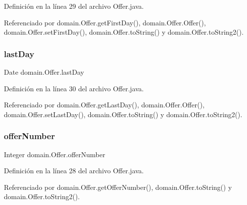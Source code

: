 Definición en la línea 29 del archivo Offer.\+java.



Referenciado por domain.\+Offer.\+get\+First\+Day(), domain.\+Offer.\+Offer(), domain.\+Offer.\+set\+First\+Day(), domain.\+Offer.\+to\+String() y domain.\+Offer.\+to\+String2().

\mbox{\label{classdomain_1_1_offer_a4d415274c0e120dd3e66e4ad46d7e2b2}} 
\subsubsection{\texorpdfstring{lastDay}{lastDay}}
{\footnotesize\ttfamily Date domain.\+Offer.\+last\+Day\hspace{0.3cm}{\ttfamily [private]}}



Definición en la línea 30 del archivo Offer.\+java.



Referenciado por domain.\+Offer.\+get\+Last\+Day(), domain.\+Offer.\+Offer(), domain.\+Offer.\+set\+Last\+Day(), domain.\+Offer.\+to\+String() y domain.\+Offer.\+to\+String2().

\mbox{\label{classdomain_1_1_offer_af77beec2989adcfb9b7b7ef399f9b363}} 
\subsubsection{\texorpdfstring{offerNumber}{offerNumber}}
{\footnotesize\ttfamily Integer domain.\+Offer.\+offer\+Number\hspace{0.3cm}{\ttfamily [private]}}



Definición en la línea 28 del archivo Offer.\+java.



Referenciado por domain.\+Offer.\+get\+Offer\+Number(), domain.\+Offer.\+to\+String() y domain.\+Offer.\+to\+String2().

\mbox{\label{classdomain_1_1_offer_a194cfe9363c5bd9e745f56978b03e7fd}} 
